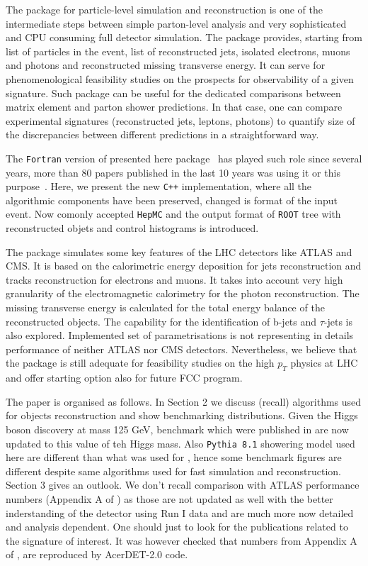 The package for particle-level simulation and reconstruction 
is  one of the intermediate steps between 
simple parton-level analysis and very sophisticated and CPU consuming
full detector simulation. The package provides, starting
from  list of particles in the event, list of reconstructed
jets, isolated electrons, muons and photons and
reconstructed missing transverse energy.
It can serve for phenomenological feasibility studies on the prospects 
for observability of a given signature. 
Such package can be useful for the dedicated comparisons between
matrix element and parton shower predictions. In that case, one can
compare experimental signatures (reconstructed jets,
leptons, photons) to quantify size of the discrepancies between
different predictions in a straightforward way. 

The {\tt Fortran} version of presented here package~\cite{AcerDET-1.0} has played such role 
since several years, more than 80 papers published in the last 10 years was using
it or this purpose~\cite{AcerDET-1.0-citations}. 
Here, we present the new {\tt C++} implementation, where all the algorithmic components
have been preserved, changed is format of the input event. 
Now comonly accepted {\tt HepMC} and the output format of {\tt  ROOT} tree with reconstructed 
objets and control histograms is introduced.

The package simulates some key features of the LHC detectors like
ATLAS and CMS. It is based on the calorimetric energy deposition for
jets reconstruction and tracks reconstruction for electrons and muons. 
It takes into account very high granularity of the electromagnetic calorimetry
for the photon reconstruction. The missing transverse energy is
calculated for the total energy balance of the reconstructed objects.
The capability for the identification of b-jets and $\tau$-jets is also
explored. Implemented set of parametrisations is 
not representing in details performance of neither ATLAS nor
CMS detectors. 
Nevertheless, we believe that the package is still adequate for 
feasibility studies on the high $p_T$ physics at LHC and offer starting option
also for future FCC program. 


The paper is organised as follows. In Section 2 we discuss (recall) algorithms
used for objects reconstruction and show benchmarking distributions. 
Given the Higgs boson discovery at mass 125 GeV, benchmark which were published
in \cite{AcerDET-1.0} are now updated to this value of teh Higgs mass. 
Also  {\tt Pythia 8.1} showering model used here are different than what was 
used for \cite{AcerDET-1.0}, hence some benchmark figures are different despite
same algorithms used for fast simulation and reconstruction. 
Section 3 gives an outlook. 
We don't recall comparison with ATLAS performance numbers 
(Appendix A of \cite{AcerDET-1.0}) as those are not updated as well with the better
inderstanding of the detector using Run I data and are much more now detailed and 
analysis dependent. One should just to look for the publications related to the 
signature of interest. It was however checked that numbers from Appendix A of 
\cite{AcerDET-1.0}, are reproduced by  AcerDET-2.0 code. 

